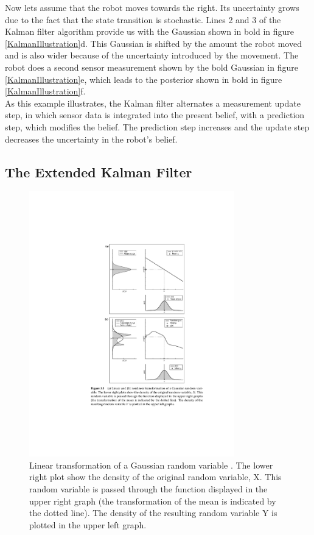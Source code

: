 \documentclass[conference]{IEEEtran}
\begin{document}
Now lets assume that the robot moves towards the right. Its uncertainty grows due to the fact that the state transition is stochastic. Lines 2 and 3 of the Kalman filter algorithm provide us with the Gaussian shown in bold in figure \ref{KalmanIllustration}d. This Gaussian is shifted by the amount the robot moved and is also wider because of the uncertainty introduced by the movement. The robot does a second sensor measurement shown by the bold Gaussian in figure \ref{KalmanIllustration}e, which leads to the posterior shown in bold in figure \ref{KalmanIllustration}f.\\

As this example illustrates, the Kalman filter alternates a measurement update step, in which sensor data is integrated into the present belief, with a prediction step, which modifies the belief. The prediction step increases and the update step decreases the uncertainty in the robot's belief.

\subsection{The Extended Kalman Filter}

\begin{figure}[!t]
\centering
\includegraphics[width=3.5in]{./figures/KalmanXform.pdf}
\caption{Linear transformation of a Gaussian random variable \cite{thrun}. The lower right plot show the density of the original random variable, X. This random variable is passed through the function displayed in the upper right graph (the transformation of the mean is indicated by the dotted line). The density of the resulting random variable Y is plotted in the upper left graph.}
\label{KalmanXform}
\end{figure}
\end{document}
